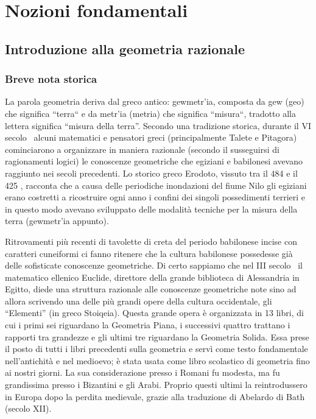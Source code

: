 \chapter{Nozioni fondamentali}

\section{Introduzione alla geometria razionale}
\subsection{Breve nota storica}
La parola geometria deriva dal greco antico: \textgreek{gewmetr'ia}, composta da \textgreek{gew} (geo) che significa “terra“ e da \textgreek{metr'ia} (metria) che significa “misura“, tradotto alla lettera significa “misura della terra”. Secondo una tradizione storica, durante il VI secolo \aC~alcuni matematici e pensatori greci (principalmente Talete e Pitagora) cominciarono a organizzare in maniera razionale (secondo il susseguirsi di ragionamenti logici) le conoscenze geometriche che egiziani e babilonesi avevano raggiunto nei secoli precedenti. Lo storico greco Erodoto, vissuto tra il 484 \aC e il 425 \aC, racconta che a causa delle periodiche inondazioni del fiume Nilo gli egiziani erano costretti a ricostruire ogni anno i confini dei singoli possedimenti terrieri e in questo modo avevano sviluppato delle modalità tecniche per la misura della terra (\textgreek{gewmetr'ia } appunto).

Ritrovamenti più recenti di tavolette di creta del periodo babilonese incise con caratteri cuneiformi ci fanno ritenere che la cultura babilonese possedesse già delle sofisticate conoscenze geometriche. Di certo sappiamo che nel III secolo \aC~il matematico ellenico Euclide, direttore della grande biblioteca di Alessandria in Egitto, diede una struttura razionale alle conoscenze geometriche note sino ad allora scrivendo una delle più grandi opere della cultura occidentale, gli “Elementi” (in greco \textgreek{Stoiqeia}). Questa grande opera è organizzata in 13 libri, di cui i primi sei riguardano la Geometria Piana, i successivi quattro trattano i rapporti tra grandezze e gli ultimi tre riguardano la Geometria Solida. Essa prese il posto di tutti i libri precedenti sulla geometria e servì come testo fondamentale nell’antichità e nel medioevo; è stata usata come libro scolastico di geometria fino ai nostri giorni. La sua considerazione presso i Romani fu modesta, ma fu grandissima presso i Bizantini e gli Arabi. Proprio questi ultimi la reintrodussero in Europa dopo la perdita medievale, grazie alla traduzione di Abelardo di Bath (secolo XII).


